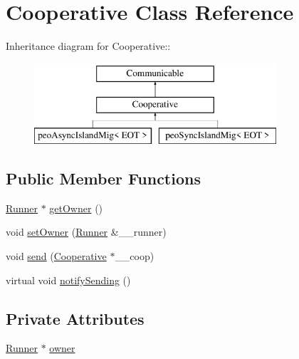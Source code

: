 \hypertarget{classCooperative}{
\section{Cooperative Class Reference}
\label{classCooperative}
}
Inheritance diagram for Cooperative::\begin{figure}[H]
\begin{center}
\leavevmode
\includegraphics[height=3cm]{classCooperative}
\end{center}
\end{figure}
\subsection*{Public Member Functions}
\begin{CompactItemize}
\item 
\hypertarget{classCooperative_4012b4e8329e87d26ee266491e1a883e}{
\hyperlink{classRunner}{Runner} $\ast$ \hyperlink{classCooperative_4012b4e8329e87d26ee266491e1a883e}{get\-Owner} ()}
\label{classCooperative_4012b4e8329e87d26ee266491e1a883e}

\item 
\hypertarget{classCooperative_fe7b022567174c8305bc78d8c5749b12}{
void \hyperlink{classCooperative_fe7b022567174c8305bc78d8c5749b12}{set\-Owner} (\hyperlink{classRunner}{Runner} \&\_\-\_\-runner)}
\label{classCooperative_fe7b022567174c8305bc78d8c5749b12}

\item 
\hypertarget{classCooperative_c609f2a1200da7d1ac96005602515fc6}{
void \hyperlink{classCooperative_c609f2a1200da7d1ac96005602515fc6}{send} (\hyperlink{classCooperative}{Cooperative} $\ast$\_\-\_\-coop)}
\label{classCooperative_c609f2a1200da7d1ac96005602515fc6}

\item 
\hypertarget{classCooperative_4439ddeaa1246a2e44c003bfb781739b}{
virtual void \hyperlink{classCooperative_4439ddeaa1246a2e44c003bfb781739b}{notify\-Sending} ()}
\label{classCooperative_4439ddeaa1246a2e44c003bfb781739b}

\end{CompactItemize}
\subsection*{Private Attributes}
\begin{CompactItemize}
\item 
\hypertarget{classCooperative_7604f094479d08154ede4996a45bf79e}{
\hyperlink{classRunner}{Runner} $\ast$ \hyperlink{classCooperative_7604f094479d08154ede4996a45bf79e}{owner}}
\label{classCooperative_7604f094479d08154ede4996a45bf79e}

\end{CompactItemize}


